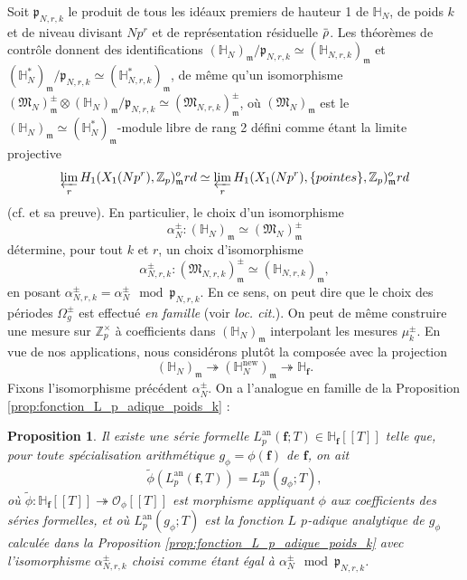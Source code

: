\documentclass[12pt]{amsart}
\newcommand\bZ{\mathbb{Z}}
\newcommand\bH{\mathbb{H}}
\newcommand\Zp{{\mathbb{Z}_{p}}}
\newcommand\cO{\mathcal{O}}
\newcommand\gm{\mathfrak{m}}
\newcommand\gp{\mathfrak{p}}
\newcommand\gM{\mathfrak{M}}
\newcommand{\ob}[1]{\mkern 1.5mu\overline{\mkern-1.5mu#1\mkern-1.5mu}\mkern 1.5mu}
\newcommand{\an}{\textrm{an}}
\theoremstyle{defstyle}
\theoremstyle{thmstyle}
\newtheorem{proposition}[subsubsection]{Proposition}
\begin{document}
Soit $\gp_{N,r,k}$ le produit de tous les idéaux premiers de hauteur 1 de $\bH_N$, de poids $k$ et de niveau divisant $Np^r$ et de représentation résiduelle $\ob{\rho}$. Les théorèmes de contrôle donnent des identifications $\left(\bH_N\right)_\gm/\gp_{N,r,k}\simeq \left(\bH_{N,r,k}\right)_\gm$  et $\left(\bH^*_N\right)_\gm/\gp_{N,r,k}\simeq \left(\bH^*_{N,r,k}\right)_\gm$, de même qu'un isomorphisme $\left(\gM_{N}\right)_\gm^\pm \otimes \left(\bH_N\right)_\gm/\gp_{N,r,k} \simeq \left(\gM_{N,r,k}\right)_\gm^\pm$, où $\left(\gM_N\right)_\gm$ est le $\left(\bH_N\right)_\gm\simeq \left(\bH^*_N\right)_\gm$-module libre de rang 2 défini comme étant la limite projective 
$$\varprojlim_r H_1(X_1(Np^r),\Zp)_\gm^\textrm{ord} \simeq \varprojlim_r H_1(X_1(Np^r),\{\textrm{pointes}\},\Zp)_\gm^\textrm{ord} $$
(cf. \cite[Proposition 3.3.1]{emerton2006variation} et sa preuve). En particulier, le choix d'un isomorphisme 
$$\alpha_N^\pm :\left(\bH_N\right)_\gm \simeq \left(\gM_N\right)^\pm_\gm$$
détermine, pour tout $k$ et $r$, un choix d'isomorphisme 
$$\alpha_{N,r,k}^\pm : \left(\gM_{N,r,k}\right)_\gm^\pm \simeq \left(\bH_{N,r,k}\right)_\gm,$$
en posant $\alpha_{N,r,k}^\pm = \alpha_N^\pm \mod \gp_{N,r,k}$. En ce sens, on peut dire que le choix des périodes $\Omega_g^\pm$ est effectué \textit{en famille} (voir \textit{loc. cit.}). On peut de même construire une mesure sur $\bZ_p^\times$ à coefficients dans $\left(\bH_N\right)_\gm$ interpolant les mesures $\mu_k^\pm$. En vue de nos applications, nous considérons plutôt la composée avec la projection 
$$\left(\bH_N\right)_\gm \twoheadrightarrow \left(\bH^\textrm{new}_N\right)_\gm \twoheadrightarrow \bH_\textbf{f}.$$
Fixons l'isomorphisme précédent $\alpha_N^\pm$. On a l'analogue en famille de la Proposition \ref{prop:fonction_L_p_adique_poids_k} : 

\begin{proposition}\label{spé}
	Il existe une série formelle $L^\an_p(\textbf{f};T) \in \bH_\textbf{f}[[T]]$ telle que, pour toute spécialisation arithmétique $g_\phi=\phi(\textbf{f})$ de $\textbf{f}$, on ait 
	$$ \tilde{\phi} \left( L^\an_p(\textbf{f},T)\right) = L^\an_p(g_\phi;T), $$
	où $\tilde{\phi}: \bH_\textbf{f}[[T]] \twoheadrightarrow \cO_\phi[[T]]$ est morphisme appliquant $\phi$ aux coefficients des séries formelles, et où $L^\an_p(g_\phi;T)$ est la fonction $L$ $p$-adique analytique de $g_\phi$ calculée dans la Proposition \ref{prop:fonction_L_p_adique_poids_k} avec l'isomorphisme $\alpha_{N,r,k}^\pm$ choisi comme étant égal à $\alpha_N^\pm \mod \gp_{N,r,k}$.
	
\end{proposition}
\end{document}
